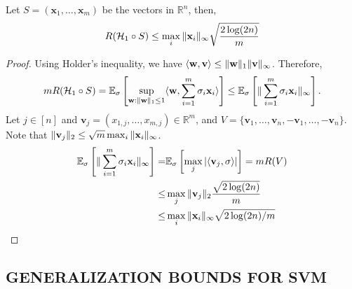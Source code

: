 \begin{lemma}
    Let $ S = ( \mathbf{x}_1, \ldots, \mathbf{x}_m ) $ be the vectors in $ \mathbb{R}^n $, then,
    \begin{equation}
        R( \mathcal{H}_1 \circ S) \le \max_i \Arrowvert \mathbf{x}_i \Arrowvert_\infty
        \sqrt{\frac{2\log(2n)}{m}}
    \end{equation}
    \begin{proof}
        Using Holder's inequality, we have $ \langle \mathbf{w}, \mathbf{v} \rangle \le \Arrowvert \mathbf{w} \Arrowvert_1 \Arrowvert \mathbf{v} \Arrowvert_\infty$. Therefore,
        \begin{align*}
            mR( \mathcal{H}_1 \circ S )
            = \mathbb{E}_\sigma \left[ \sup_{\mathbf{w}:\Arrowvert \mathbf{w} \Arrowvert_1 \le 1} \langle \mathbf{w}, \sum^{m}_{i=1} \sigma_i \mathbf{x}_i \rangle \right]
            \le \mathbb{E}_\sigma \left[ \Arrowvert \sum^{m}_{i=1} \sigma_i \mathbf{x}_i \Arrowvert_\infty \right].
        \end{align*}
        Let $ j \in [n] $ and $ \mathbf{v}_j = ( x_{1,j}, \ldots, x_{m,j}) \in \mathbb{R}^m $,
        and $ V = \{ \mathbf{v}_1, \ldots, \mathbf{v}_n, - \mathbf{v}_1, \ldots, - \mathbf{v}_n \} $.
        Note that $ \Arrowvert \mathbf{v}_j \Arrowvert_2 \le \sqrt{m} \max_i \Arrowvert \mathbf{x}_i \Arrowvert_\infty $.
        \begin{align*}
            \mathbb{E}_\sigma \left[ \Arrowvert \sum^{m}_{i=1} \sigma_i \mathbf{x}_i \Arrowvert_\infty \right]
            =& \mathbb{E}_\sigma \left[ \max_j | \langle \mathbf{v}_j, \sigma \rangle | \right]
            = m R(V) \\
            \le& \max_j \Arrowvert \mathbf{v}_j \Arrowvert_2 \frac{\sqrt{2\log(2n)}}{m} \\
            \le& \max_i \Arrowvert \mathbf{x}_i \Arrowvert_\infty \sqrt{2\log(2n)/m}
        \end{align*}
    \end{proof}
\end{lemma}

\subsection{GENERALIZATION BOUNDS FOR SVM}%
\label{sub:generalization_bounds_for_svm}


